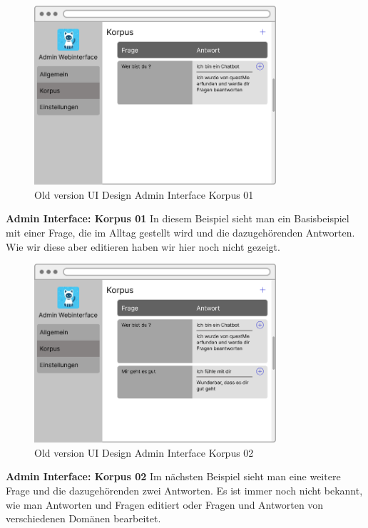 \begin{figure}[H]
    \centering
    \includegraphics[width=0.8\textwidth]{bilder/old vers. UI Design/Admin Interface I.png}
    \caption{Old version UI Design Admin Interface Korpus 01}
    \label{fig:Old version UI Design Admin Interface Korpus 01}
    \end{figure}
\noindent \textbf{Admin Interface: Korpus 01} \newline
In diesem Beispiel sieht man ein Basisbeispiel mit einer Frage, die im Alltag gestellt wird und die dazugehörenden Antworten. Wie wir diese aber
editieren haben wir hier noch nicht gezeigt.

\begin{figure}[H]
    \centering
    \includegraphics[width=0.8\textwidth]{bilder/old vers. UI Design/Admin Interface II.png}
    \caption{Old version UI Design Admin Interface Korpus 02}
    \label{fig:Old version UI Design Admin Interface Korpus 02}
    \end{figure}
\noindent \textbf{Admin Interface: Korpus 02} \newline
Im nächsten Beispiel sieht man eine weitere Frage und die dazugehörenden zwei Antworten. Es ist immer noch nicht
bekannt, wie man Antworten und Fragen editiert oder Fragen und Antworten von verschiedenen Domänen bearbeitet.

